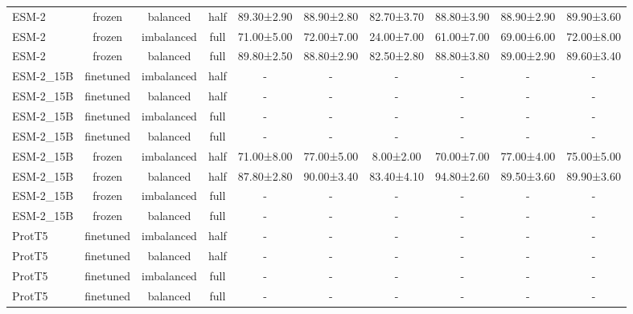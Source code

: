 \begin{tabular}{lccccccccc}
       ESM-2 &         frozen &   balanced &      half &  89.30±2.90 &  88.90±2.80 & 82.70±3.70 & 88.80±3.90 &  88.90±2.90 &  89.90±3.60 \\
       ESM-2 &         frozen & imbalanced &      full &  71.00±5.00 &  72.00±7.00 & 24.00±7.00 & 61.00±7.00 &  69.00±6.00 &  72.00±8.00 \\
       ESM-2 &         frozen &   balanced &      full &  89.80±2.50 &  88.80±2.90 & 82.50±2.80 & 88.80±3.80 &  89.00±2.90 &  89.60±3.40 \\
   ESM-2\_15B &      finetuned & imbalanced &      half &           - &           - &          - &          - &           - &           - \\
   ESM-2\_15B &      finetuned &   balanced &      half &           - &           - &          - &          - &           - &           - \\
   ESM-2\_15B &      finetuned & imbalanced &      full &           - &           - &          - &          - &           - &           - \\
   ESM-2\_15B &      finetuned &   balanced &      full &           - &           - &          - &          - &           - &           - \\
   ESM-2\_15B &         frozen & imbalanced &      half &  71.00±8.00 &  77.00±5.00 &  8.00±2.00 & 70.00±7.00 &  77.00±4.00 &  75.00±5.00 \\
   ESM-2\_15B &         frozen &   balanced &      half &  87.80±2.80 &  90.00±3.40 & 83.40±4.10 & 94.80±2.60 &  89.50±3.60 &  89.90±3.60 \\
   ESM-2\_15B &         frozen & imbalanced &      full &           - &           - &          - &          - &           - &           - \\
   ESM-2\_15B &         frozen &   balanced &      full &           - &           - &          - &          - &           - &           - \\
      ProtT5 &      finetuned & imbalanced &      half &           - &           - &          - &          - &           - &           - \\
      ProtT5 &      finetuned &   balanced &      half &           - &           - &          - &          - &           - &           - \\
      ProtT5 &      finetuned & imbalanced &      full &           - &           - &          - &          - &           - &           - \\
      ProtT5 &      finetuned &   balanced &      full &           - &           - &          - &          - &           - &           - \\

\end{tabular}
